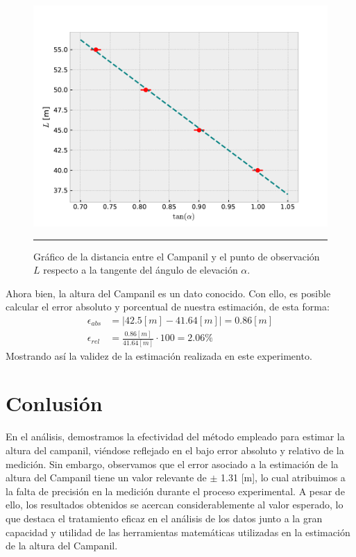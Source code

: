 \documentclass[10pt,a4paper]{article}
\begin{document}
\begin{multicols}{2}
	\begin{figure}[H]
		\centering
		\includegraphics[scale=0.5]{IMG/proporcionalidad.pdf}
		\caption{Gráfico de la distancia entre el Campanil y el punto de observación $L$ respecto a la tangente del ángulo de elevación $\alpha$.}
		\label{Grafico de proporcionalidad}
		\rule{80mm}{0.1mm}
	\end{figure} 

Ahora bien, la altura del Campanil es un dato conocido. Con ello, es posible calcular el error absoluto y porcentual de nuestra estimación, de esta forma:
\begin{align*}
\epsilon_{abs} &= |42.5[m] - 41.64[m]| = 0.86 [m]\\
\epsilon_{rel} &= \frac{0.86[m]}{41.64[m]}\cdot 100 = 2.06 \% 
\end{align*}
Mostrando así la validez de la estimación realizada en este experimento.
	
\section{Conlusión}
En el análisis, demostramos la efectividad del método empleado para estimar la altura del campanil, viéndose reflejado en el bajo error absoluto y relativo de la medición. Sin embargo, observamos que el error asociado a la estimación de la altura del Campanil tiene un valor relevante de $\pm$ 1.31 [m], lo cual atribuimos a la falta de precisión en la medición durante el proceso experimental. A pesar de ello, los resultados obtenidos se acercan considerablemente al valor esperado, lo que destaca el tratamiento eficaz en el análisis de los datos junto a la gran capacidad y utilidad de las herramientas matemáticas utilizadas en la estimación de la altura del Campanil.



		
	\end{multicols}
	
	
	
\end{document}
